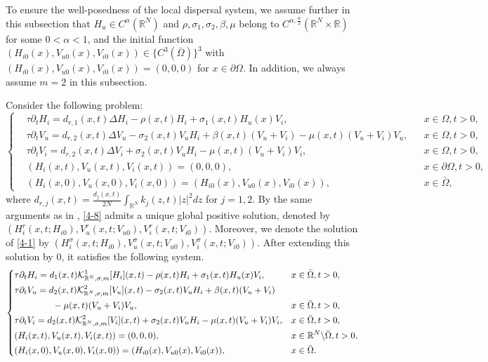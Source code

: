 \documentclass[11pt,reqno]{amsart}
\numberwithin{equation}{section}
\begin{document}
To ensure the well-posedness of the local dispersal system, we assume further in this subsection that $H_{u}\in C^{\alpha}(\mathbb{R}^{N})$  and  $ \rho, \sigma_{1}, \sigma_{2}, \beta, \mu$ belong to $C^{\alpha,\frac{\alpha}{2}}(\mathbb{R}^{N} \times \mathbb{R})$ for some $0<\alpha<1$, and the initial function $(H_{i0}(x), V_{u0}(x), V_{i0}(x)) \in \{C^{3}(\bar\Omega)\}^{3}$ with $(H_{i0}(x), V_{u0}(x), V_{i0}(x))=(0,0,0)$ for $x\in\partial\Omega$. In addition, we always assume $m=2$ in this subsection.


Consider the following problem:
\begin{equation}\label{4-8}
\left\{
\begin{aligned}
&\tau \partial_{t} H_{i}
= d_{r,1}(x,t)\Delta H_{i} -\rho(x,t)H_{i}+\sigma_{1}(x,t)H_{u}(x)V_{i},& &x\in\Omega, t>0,\\
&\tau \partial_{t} V_{u}
= d_{r,2}(x,t)\Delta V_{u}  -\sigma_{2}(x,t)V_{u}H_{i}+\beta(x,t)(V_{u}+V_{i})-\mu(x,t)(V_{u}+V_{i})V_{u},&&x\in \Omega, t>0, \\
&\tau \partial_{t} V_{i}
= d_{r,2}(x,t)\Delta V_{i} + \sigma_{2}(x,t)V_{u}H_{i}-\mu(x,t)(V_{u}+V_{i})V_{i},&&x\in \Omega, t>0,\\
& (H_{i}(x,t), V_{u}(x,t), V_{i}(x,t))=(0, 0, 0),&&x\in \partial\Omega, t>0, \\
&(H_{i}(x,0), V_{u}(x,0), V_{i}(x,0))=(H_{i0}(x), V_{u0}(x), V_{i0}(x)),
&&x\in \bar\Omega,
\end{aligned}
\right.
\end{equation}
where $d_{r,j}(x,t)= \frac{d_{j}(x,t)}{2N} \int_{\mathbb{R}^{N}} k_{j}(z,t)|z|^{2}dz$ for $j=1,2$.
By the same arguments as in \cite{MWW,LZ}, \eqref{4-8} admits a unique global positive solution, denoted by
$(H_{i}^{r}(x,t;H_{i0}), V_{u}^{r}(x,t;V_{u0}), V_{i}^{r}(x,t;V_{i0}))$.
Moreover, we denote the solution of \eqref{4-1} by
$(H_{i}^{\sigma}(x,t;H_{i0}), V_{u}^{\sigma}(x,t;V_{u0}), V_{i}^{\sigma}(x,t;V_{i0}))$.
After extending this solution by $0$, it satisfies the following system.
\begin{equation*}
\left\{
\begin{aligned}
&\tau \partial_{t} H_{i} =d_{1}(x,t)\mathcal{K}^{1}_{\mathbb{R}^{N},\sigma,m}[H_{i}](x,t)-\rho(x,t)H_{i}+\sigma_{1}(x,t)H_{u}(x)V_{i}, &x&\in \bar\Omega, t>0,\\
&\tau \partial_{t} V_{u}
=d_{2}(x,t)\mathcal{K}^{2}_{\mathbb{R}^{N},\sigma,m}[V_{u}](x,t)-\sigma_{2}(x,t)V_{u}H_{i}+\beta(x,t)(V_{u}+V_{i})\\
&\hspace{1.5cm}-\mu(x,t)(V_{u}+V_{i})V_{u},&x&\in \bar\Omega, t>0, \\
&\tau \partial_{t} V_{i}
=d_{2}(x,t)\mathcal{K}^{2}_{\mathbb{R}^{N},\sigma,m}[V_{i}](x,t)+\sigma_{2}(x,t)V_{u}H_{i}-\mu(x,t)(V_{u}+V_{i})V_{i},&x&\in \bar\Omega, t>0,\\
&(H_{i}(x,t), V_{u}(x,t), V_{i}(x,t)) = (0,0,0), &x&\in \mathbb{R}^{N}\backslash\bar\Omega, t>0, \\
&(H_{i}(x,0), V_{u}(x,0), V_{i}(x,0))=(H_{i0}(x), V_{u0}(x), V_{i0}(x)),&x&\in\bar\Omega.
\end{aligned}
\right.
\end{equation*}
\end{document}
